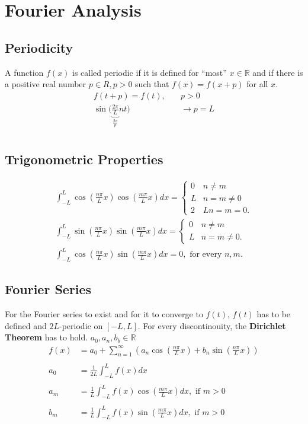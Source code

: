 \section{Fourier Analysis}

\subsection{Periodicity}
A function $f(x)$ is called periodic if it is defined for “most” $x \in \mathbb{R} $ and if there is a positive real number $p \in R, p > 0$ such that $f(x) = f(x+p)$ for all $x$.
\begin{align*}
    f(t+p)=f(t),\quad &p>0\\
    \sin\biggl( \underbrace{\frac{2\pi}{L}}_{\frac{2\pi}{p}}nt \biggr) &\rightarrow p=L \\
\end{align*}

\subsection{Trigonometric Properties}
\begin{align*}
    \int_{-L}^L\cos\left(\frac{n\pi}Lx\right)\cos\left(\frac{m\pi}Lx\right)dx=\begin{cases}0&n\neq m\\L&n=m\neq0\\2&Ln=m=0.\end{cases}\\
    \int_{-L}^L\sin\left(\frac{n\pi}Lx\right)\sin\left(\frac{m\pi}Lx\right)dx=\begin{cases}0&n\neq m\\L&n=m\neq0.\end{cases}\\
    \int_{-L}^L\cos\left(\frac{n\pi}Lx\right)\sin\left(\frac{m\pi}Lx\right)dx=0,\text{ for every }n,m.
\end{align*}

\subsection{Fourier Series}
For the Fourier series to exist and for it to converge to $f(t)$, $f(t)$ has to be defined and $2L$-periodic on $[-L,L]$. 
For every discontinouity, the \textbf{Dirichlet Theorem} has to hold. $a_0,a_n,b_b\in \mathbb{R}$
\begin{align*}
    f(x)&=a_0+\sum_{n=1}^\infty\left(a_n\cos\left(\frac{n\pi}Lx\right)+b_n\sin\left(\frac{n\pi}Lx\right)\right) \\ \\
    a_{0} &=\frac{1}{2L}\int_{-L}^{L}f(x)dx  \\ \\
    a_{m} &=\frac{1}{L}\int_{-L}^{L}f(x)\cos\left(\frac{m\pi}{L}x\right)dx,\text{ if }m>0 \\ \\
    b_{m}&=\frac{1}{L}\int_{-L}^{L}f(x)\sin\left(\frac{m\pi}{L}x\right)dx,\text{ if }m>0
\end{align*}
